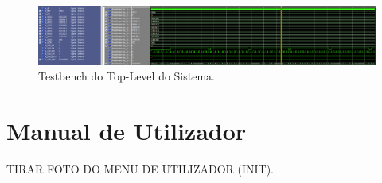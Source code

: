 \documentclass{report}
\begin{document}
\begin{figure}[h!] %
	\center
	\includegraphics[width=335pt]{images/TopLevelTB_2}
	\caption{Testbench do Top-Level do Sistema.}
	\label{fig:imagem9}
\end{figure}

\chapter{Manual de Utilizador}
\label{chap.manualUtilizador}
TIRAR FOTO DO MENU DE UTILIZADOR (INIT).
\end{document}
